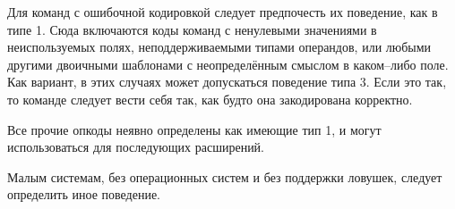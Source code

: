 \documentclass[forwardcom.tex]{subfiles}
\begin{document}
Для команд с ошибочной кодировкой следует предпочесть их поведение, как в типе 1. Сюда включаются коды команд с ненулевыми значениями в неиспользуемых полях, неподдерживаемыми типами операндов, или любыми другими двоичными шаблонами с неопределённым смыслом в каком--либо поле. Как вариант, в этих случаях может допускаться поведение типа 3. Если это так, то команде следует вести себя так, как будто она закодирована корректно.

Все прочие опкоды неявно определены как имеющие тип 1, и могут использоваться для последующих расширений.

Малым системам, без операционных систем и без поддержки ловушек, следует определить иное поведение. 
\end{document}
